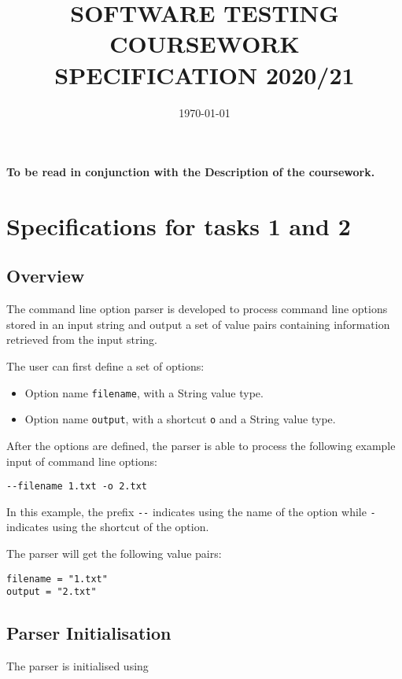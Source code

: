 \documentclass{article}
\title{SOFTWARE TESTING COURSEWORK SPECIFICATION 2020/21}
\date{\today}
\begin{document}
\maketitle

\textbf{To be read in conjunction with the Description of the coursework.}

\section{Specifications for tasks 1 and 2}

\subsection{Overview}

The command line option parser is developed to process command line options stored in an
input string and output a set of value pairs containing information retrieved from the input string.

The user can first define a set of options:

\begin{itemize}
\item Option name \lstinline{filename}, with a String value type.
\item Option name \lstinline{output}, with a shortcut \lstinline{o} and a String value type.
\end{itemize}

After the options are defined, the parser is able to process the following example input of
command line options:

\begin{lstlisting}
--filename 1.txt -o 2.txt
\end{lstlisting}

In this example, the prefix \lstinline{--} indicates using the name of
the option while \lstinline{-} indicates using the shortcut of the
option.

The parser will get the following value pairs:

\begin{lstlisting}
filename = "1.txt"
output = "2.txt"
\end{lstlisting}
  
\subsection{Parser Initialisation}

The parser is initialised using
\end{document}
